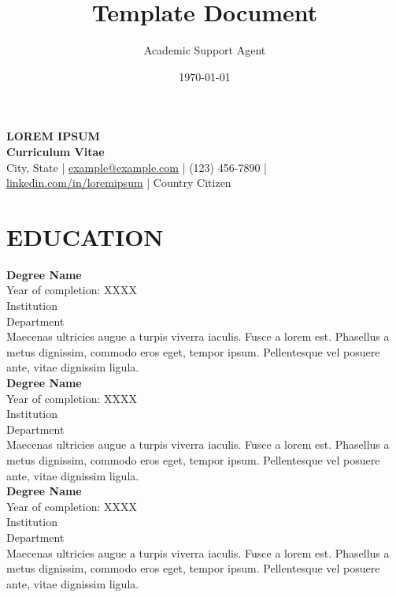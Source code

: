 \documentclass{article}
\title{Template Document}
\author{Academic Support Agent}
\date{\today}
\begin{document}
\maketitle

\pagestyle{empty}

\begin{center}
\textbf{\Large LOREM IPSUM }\\[3pt] %
\textbf{Curriculum Vitae}\\[1pt] %
City, State | \href{mailto:example@example.com}{example@example.com} | (123) 456-7890 | \href{https://www.linkedin.com/in/loremipsum}{linkedin.com/in/loremipsum} | Country Citizen %
\end{center}


\section*{EDUCATION}

\noindent
\newline
\textbf{Degree Name} \\
Year of completion: XXXX \\ 
Institution \\ 
Department \\
Maecenas ultricies augue a turpis viverra iaculis. Fusce a lorem est. Phasellus a metus dignissim, commodo eros eget, tempor ipsum. Pellentesque vel posuere ante, vitae dignissim ligula. \\

\noindent
\textbf{Degree Name} \\
Year of completion: XXXX \\ 
Institution \\ 
Department \\
Maecenas ultricies augue a turpis viverra iaculis. Fusce a lorem est. Phasellus a metus dignissim, commodo eros eget, tempor ipsum. Pellentesque vel posuere ante, vitae dignissim ligula. \\

\noindent
\textbf{Degree Name} \\
Year of completion: XXXX \\ 
Institution \\ 
Department  \\
Maecenas ultricies augue a turpis viverra iaculis. Fusce a lorem est. Phasellus a metus dignissim, commodo eros eget, tempor ipsum. Pellentesque vel posuere ante, vitae dignissim ligula. 
\end{document}
